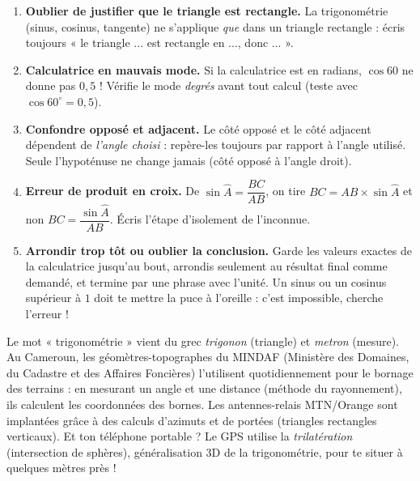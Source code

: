 \documentclass[11pt]{article}
\begin{document}
\begin{attention}
\begin{enumerate}
\item \textbf{Oublier de justifier que le triangle est rectangle.} La trigonométrie (sinus, cosinus, tangente) ne s'applique \emph{que} dans un triangle rectangle : écris toujours « le triangle ... est rectangle en ..., donc ... ».
\item \textbf{Calculatrice en mauvais mode.} Si la calculatrice est en radians, $\cos 60$ ne donne pas $0{,}5$ ! Vérifie le mode \emph{degrés} avant tout calcul (teste avec $\cos 60^{\circ} = 0{,}5$).
\item \textbf{Confondre opposé et adjacent.} Le côté opposé et le côté adjacent dépendent de \emph{l'angle choisi} : repère-les toujours par rapport à l'angle utilisé. Seule l'hypoténuse ne change jamais (côté opposé à l'angle droit).
\item \textbf{Erreur de produit en croix.} De $\sin \widehat{A} = \dfrac{BC}{AB}$, on tire $BC = AB \times \sin \widehat{A}$ et non $BC = \dfrac{\sin \widehat{A}}{AB}$. Écris l'étape d'isolement de l'inconnue.
\item \textbf{Arrondir trop tôt ou oublier la conclusion.} Garde les valeurs exactes de la calculatrice jusqu'au bout, arrondis seulement au résultat final comme demandé, et termine par une phrase avec l'unité. Un sinus ou un cosinus supérieur à $1$ doit te mettre la puce à l'oreille : c'est impossible, cherche l'erreur !
\end{enumerate}
\end{attention}

\begin{savaistu}
Le mot « trigonométrie » vient du grec \emph{trigonon} (triangle) et \emph{metron} (mesure). Au Cameroun, les géomètres-topographes du MINDAF (Ministère des Domaines, du Cadastre et des Affaires Foncières) l'utilisent quotidiennement pour le bornage des terrains : en mesurant un angle et une distance (méthode du rayonnement), ils calculent les coordonnées des bornes. Les antennes-relais MTN/Orange sont implantées grâce à des calculs d'azimuts et de portées (triangles rectangles verticaux). Et ton téléphone portable ? Le GPS utilise la \emph{trilatération} (intersection de sphères), généralisation 3D de la trigonométrie, pour te situer à quelques mètres près !
\end{savaistu}

\newpage
\end{document}
